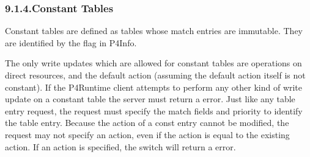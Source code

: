 \documentclass[11pt]{article}
\begin{document}
{%
\subsubsection{9.1.4.\hspace*{0.5em}Constant Tables}\label{sec-constant-tables}%

\noindent{}Constant tables are defined as tables whose match entries are immutable. They
are identified by the  flag in P4Info.%

The only write updates which are allowed for constant tables are 
operations on direct resources, and the default action (assuming the default
action itself is not constant). If the P4Runtime client attempts to perform any
other kind of write update on a constant table the server must return a
 error. Just like any table entry  request, the
request must specify the match fields and priority to identify the table
entry. Because the action of a const entry cannot be modified, the request
may not specify an action, even if the action is equal to the existing action.
If an action is specified, the switch will return a  error.%

}
\end{document}
